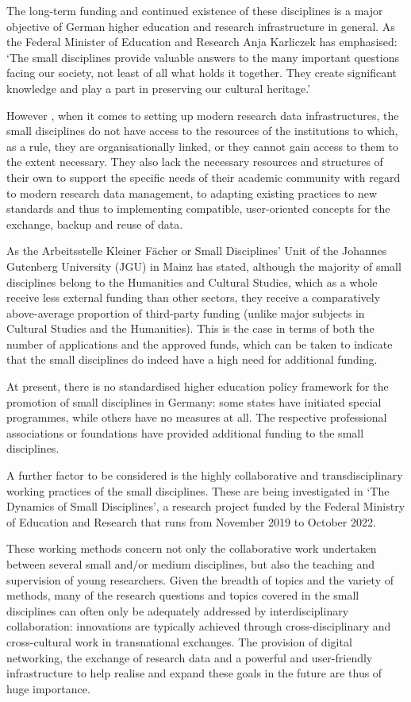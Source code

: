 \documentclass[
  english,
  paper=a4,
  oneside,captions=tableheading
]{scrbook}
\begin{document}
The long-term funding and continued existence of these disciplines is a
major objective of German higher education and research infrastructure
in general. As the Federal Minister of Education and Research Anja
Karliczek has emphasised: `The small disciplines provide valuable
answers to the many important questions facing our society, not least of
all what holds it together. They create significant knowledge and play a
part in preserving our cultural heritage.'

However , when it comes to setting up modern research data
infrastructures, the small disciplines do not have access to the
resources of the institutions to which, as a rule, they are
organisationally linked, or they cannot gain access to them to the
extent necessary. They also lack the necessary resources and structures
of their own to support the specific needs of their academic community
with regard to modern research data management, to adapting existing
practices to new standards and thus to implementing compatible,
user-oriented concepts for the exchange, backup and reuse of data.

As the Arbeitsstelle Kleiner Fächer or Small Disciplines' Unit of the
Johannes Gutenberg University (JGU) in Mainz has stated, although the
majority of small disciplines belong to the Humanities and Cultural
Studies, which as a whole receive less external funding than other
sectors, they receive a comparatively above-average proportion of
third-party funding (unlike major subjects in Cultural Studies and the
Humanities). This is the case in terms of both the number of
applications and the approved funds, which can be taken to indicate that
the small disciplines do indeed have a high need for additional funding.

At present, there is no standardised higher education policy framework
for the promotion of small disciplines in Germany: some states have
initiated special programmes, while others have no measures at all. The
respective professional associations or foundations have provided
additional funding to the small disciplines.

A further factor to be considered is the highly collaborative and
transdisciplinary working practices of the small disciplines. These are
being investigated in `The Dynamics of Small Disciplines', a research
project funded by the Federal Ministry of Education and Research that
runs from November 2019 to October 2022.

These working methods concern not only the collaborative work undertaken
between several small and/or medium disciplines, but also the teaching
and supervision of young researchers. Given the breadth of topics and
the variety of methods, many of the research questions and topics
covered in the small disciplines can often only be adequately addressed
by interdisciplinary collaboration: innovations are typically achieved
through cross-disciplinary and cross-cultural work in transnational
exchanges. The provision of digital networking, the exchange of research
data and a powerful and user-friendly infrastructure to help realise and
expand these goals in the future are thus of huge importance.
\end{document}
